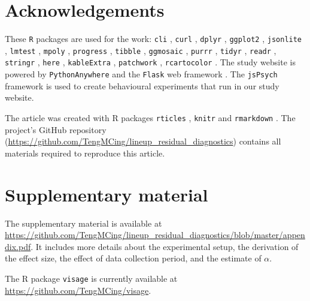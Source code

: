 \documentclass[]{interact}
\theoremstyle{plain}%
\theoremstyle{definition}
\theoremstyle{remark}
\begin{document}
\hypertarget{acknowledgements}{%
\section*{Acknowledgements}\label{acknowledgements}}

These \texttt{R} packages are used for the work: \texttt{cli}
\citep{cli}, \texttt{curl} \citep{curl}, \texttt{dplyr} \citep{dplyr},
\texttt{ggplot2} \citep{ggplot2}, \texttt{jsonlite} \citep{jsonlite},
\texttt{lmtest} \citep{lmtest}, \texttt{mpoly} \citep{mpoly},
\texttt{progress} \citep{progress}, \texttt{tibble} \citep{tibble},
\texttt{ggmosaic} \citep{ggmosaic}, \texttt{purrr} \citep{purrr},
\texttt{tidyr} \citep{tidyr}, \texttt{readr} \citep{readr},
\texttt{stringr} \citep{stringr}, \texttt{here} \citep{here},
\texttt{kableExtra} \citep{kableextra}, \texttt{patchwork}
\citep{patchwork}, \texttt{rcartocolor} \citep{rcartocolor}. The study
website is powered by \texttt{PythonAnywhere} \citep{pythonanywhere} and
the \texttt{Flask} web framework \citep{flask}. The \texttt{jsPsych}
framework \citep{jspsych} is used to create behavioural experiments that
run in our study website.

The article was created with R packages \texttt{rticles}
\citep{rticles}, \texttt{knitr} \citep{knitr} and \texttt{rmarkdown}
\citep{rmarkdown}. The project's GitHub repository
(\url{https://github.com/TengMCing/lineup_residual_diagnostics})
contains all materials required to reproduce this article.

\hypertarget{supplementary-material}{%
\section*{Supplementary material}\label{supplementary-material}}

The supplementary material is available at
\url{https://github.com/TengMCing/lineup_residual_diagnostics/blob/master/appendix.pdf}.
It includes more details about the experimental setup, the derivation of
the effect size, the effect of data collection period, and the estimate
of \(\alpha\).

The R package \texttt{visage} is currently available at
\url{https://github.com/TengMCing/visage}.



\end{document}
